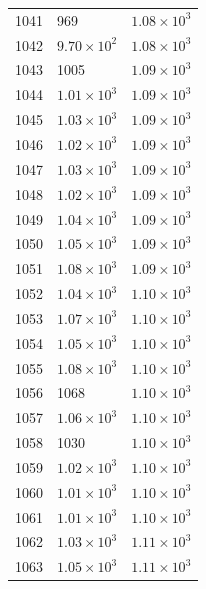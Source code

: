 \begin{table}[H]
\begin{tabular}{lll}
1041 & 969 & $\displaystyle 1.08 \times 10^{3}$ \\
1042 & $\displaystyle 9.70 \times 10^{2}$ & $\displaystyle 1.08 \times 10^{3}$ \\
1043 & 1005 & $\displaystyle 1.09 \times 10^{3}$ \\
1044 & $\displaystyle 1.01 \times 10^{3}$ & $\displaystyle 1.09 \times 10^{3}$ \\
1045 & $\displaystyle 1.03 \times 10^{3}$ & $\displaystyle 1.09 \times 10^{3}$ \\
1046 & $\displaystyle 1.02 \times 10^{3}$ & $\displaystyle 1.09 \times 10^{3}$ \\
1047 & $\displaystyle 1.03 \times 10^{3}$ & $\displaystyle 1.09 \times 10^{3}$ \\
1048 & $\displaystyle 1.02 \times 10^{3}$ & $\displaystyle 1.09 \times 10^{3}$ \\
1049 & $\displaystyle 1.04 \times 10^{3}$ & $\displaystyle 1.09 \times 10^{3}$ \\
1050 & $\displaystyle 1.05 \times 10^{3}$ & $\displaystyle 1.09 \times 10^{3}$ \\
1051 & $\displaystyle 1.08 \times 10^{3}$ & $\displaystyle 1.09 \times 10^{3}$ \\
1052 & $\displaystyle 1.04 \times 10^{3}$ & $\displaystyle 1.10 \times 10^{3}$ \\
1053 & $\displaystyle 1.07 \times 10^{3}$ & $\displaystyle 1.10 \times 10^{3}$ \\
1054 & $\displaystyle 1.05 \times 10^{3}$ & $\displaystyle 1.10 \times 10^{3}$ \\
1055 & $\displaystyle 1.08 \times 10^{3}$ & $\displaystyle 1.10 \times 10^{3}$ \\
1056 & 1068 & $\displaystyle 1.10 \times 10^{3}$ \\
1057 & $\displaystyle 1.06 \times 10^{3}$ & $\displaystyle 1.10 \times 10^{3}$ \\
1058 & 1030 & $\displaystyle 1.10 \times 10^{3}$ \\
1059 & $\displaystyle 1.02 \times 10^{3}$ & $\displaystyle 1.10 \times 10^{3}$ \\
1060 & $\displaystyle 1.01 \times 10^{3}$ & $\displaystyle 1.10 \times 10^{3}$ \\
1061 & $\displaystyle 1.01 \times 10^{3}$ & $\displaystyle 1.10 \times 10^{3}$ \\
1062 & $\displaystyle 1.03 \times 10^{3}$ & $\displaystyle 1.11 \times 10^{3}$ \\
1063 & $\displaystyle 1.05 \times 10^{3}$ & $\displaystyle 1.11 \times 10^{3}$ \\

\end{tabular}
\end{table}
